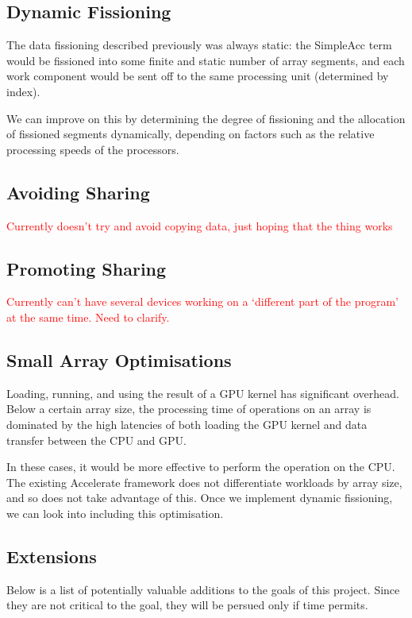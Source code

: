 \documentclass[a4paper,12pt]{article}
\newcommand{\red}[1]{\textcolor{red}{#1}}
\begin{document}
\subsection{Dynamic Fissioning}
The data fissioning described previously was always static: the SimpleAcc term would be fissioned into some finite and static number of array segments, and each work component would be sent off to the same processing unit (determined by index).

We can improve on this by determining the degree of fissioning and the allocation of fissioned segments dynamically, depending on factors such as the relative processing speeds of the processors.

\subsection{Avoiding Sharing}
\red{Currently doesn't try and avoid copying data, just hoping that the thing works}

\subsection{Promoting Sharing}
\red{Currently can't have several devices working on a `different part of the program' at the same time. Need to clarify.}

\subsection{Small Array Optimisations}
Loading, running, and using the result of a GPU kernel has significant overhead.
Below a certain array size, the processing time of operations on an array is dominated by the high latencies of both loading the GPU kernel and data transfer between the CPU and GPU.

In these cases, it would be more effective to perform the operation on the CPU.
The existing Accelerate framework does not differentiate workloads by array size, and so does not take advantage of this.
Once we implement dynamic fissioning, we can look into including this optimisation.

\subsection{Extensions}
Below is a list of potentially valuable additions to the goals of this project.
Since they are not critical to the goal, they will be persued only if time permits.
\end{document}
